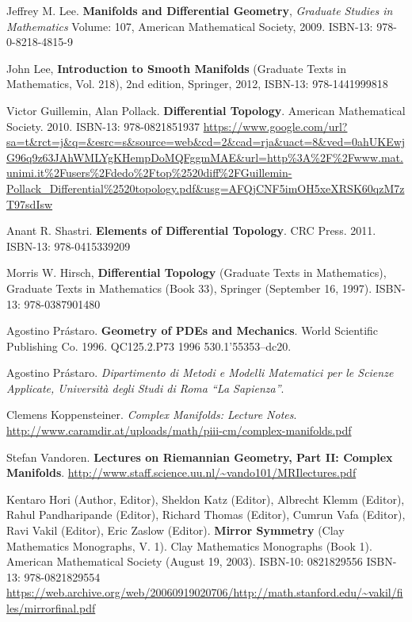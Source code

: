 \documentclass[10pt]{amsart}
\begin{document}
\begin{thebibliography}{9}


Jeffrey M. Lee. \textbf{Manifolds and Differential Geometry}, \emph{Graduate Studies in Mathematics} Volume: 107, American Mathematical Society, 2009. ISBN-13: 978-0-8218-4815-9

John Lee, \textbf{Introduction to Smooth Manifolds} (Graduate Texts in Mathematics, Vol. 218), 2nd edition, Springer,  2012, ISBN-13: 978-1441999818

Victor Guillemin, Alan Pollack. \textbf{Differential Topology}. American Mathematical Society. 2010. ISBN-13: 978-0821851937
\url{https://www.google.com/url?sa=t&rct=j&q=&esrc=s&source=web&cd=2&cad=rja&uact=8&ved=0ahUKEwjG96q9z63JAhWMLYgKHempDoMQFggmMAE&url=http\%3A\%2F\%2Fwww.mat.unimi.it\%2Fusers\%2Fdedo\%2Ftop\%2520diff\%2FGuillemin-Pollack_Differential\%2520topology.pdf&usg=AFQjCNF5imOH5xeXRSK60qzM7zT97sdIsw}

Anant R. Shastri. \textbf{Elements of Differential Topology}. CRC Press. 2011. ISBN-13: 978-0415339209

Morris W. Hirsch, \textbf{Differential Topology} (Graduate Texts in Mathematics), Graduate Texts in Mathematics (Book 33), Springer (September 16, 1997). ISBN-13: 978-0387901480

Agostino Pr\'{a}staro.  \textbf{Geometry of PDEs and Mechanics}.  World Scientific Publishing Co.  1996.  QC125.2.P73 1996  530.1'55353--dc20.  

Agostino Pr\'{a}staro.  \emph{Dipartimento di Metodi e Modelli Matematici per le Scienze Applicate, Universit\`{a} degli Studi di Roma ``La Sapienza''}.  

  Clemens Koppensteiner.  \emph{Complex Manifolds: Lecture Notes}.  \url{http://www.caramdir.at/uploads/math/piii-cm/complex-manifolds.pdf}
  

Stefan Vandoren. \textbf{Lectures on Riemannian Geometry, Part II: Complex Manifolds}.  \url{http://www.staff.science.uu.nl/~vando101/MRIlectures.pdf} 

Kentaro Hori (Author, Editor), Sheldon Katz (Editor), Albrecht Klemm (Editor), Rahul Pandharipande (Editor), Richard Thomas (Editor), Cumrun Vafa (Editor), Ravi Vakil (Editor), Eric Zaslow (Editor).  \textbf{Mirror Symmetry} (Clay Mathematics Monographs, V. 1).  Clay Mathematics Monographs (Book 1).  American Mathematical Society (August 19, 2003).  ISBN-10: 0821829556  ISBN-13: 978-0821829554  \url{https://web.archive.org/web/20060919020706/http://math.stanford.edu/~vakil/files/mirrorfinal.pdf}




\end{thebibliography}
\end{document}
